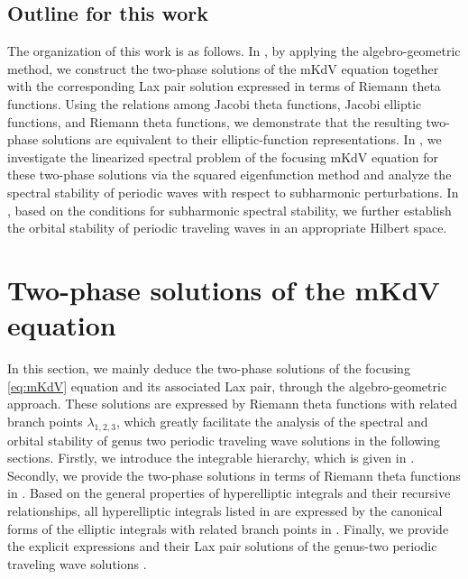 \documentclass[11pt,reqno]{amsart}
\numberwithin{equation}{section}
\begin{document}
\subsection{Outline for this work}

The organization of this work is as follows. 
In , by applying the algebro-geometric method, we construct the two-phase solutions of the mKdV equation together with the corresponding Lax pair solution expressed in terms of Riemann theta functions. 
Using the relations among Jacobi theta functions, Jacobi elliptic functions, and Riemann theta functions, we demonstrate that the resulting two-phase solutions are equivalent to their elliptic-function representations.
In , we investigate the linearized spectral problem of the focusing mKdV equation for these two-phase solutions via the squared eigenfunction method and analyze the spectral stability of periodic waves with respect to subharmonic perturbations.
In , based on the conditions for subharmonic spectral stability, we further establish the orbital stability of periodic traveling waves in an appropriate Hilbert space.


\section{Two-phase solutions  of the mKdV equation}\label{sec:algebro-geo-solution}
In this section, we mainly deduce the two-phase solutions  of the focusing \ref{eq:mKdV} equation and its associated Lax pair, through the algebro-geometric approach. 
These solutions are expressed by Riemann theta functions with related branch points $\lambda_{1,2,3}$, which greatly facilitate the analysis of the spectral and orbital stability of genus two periodic traveling wave solutions  in the following sections.
Firstly, we introduce the integrable hierarchy, which is given in .
Secondly, we provide the two-phase solutions in terms of Riemann theta functions in .
Based on the general properties of hyperelliptic integrals and their recursive relationships, all hyperelliptic integrals listed in  are expressed by the canonical forms of the elliptic integrals with related branch points in . 
Finally, we provide the explicit expressions and their Lax pair solutions of the genus-two periodic traveling wave solutions .
\end{document}
